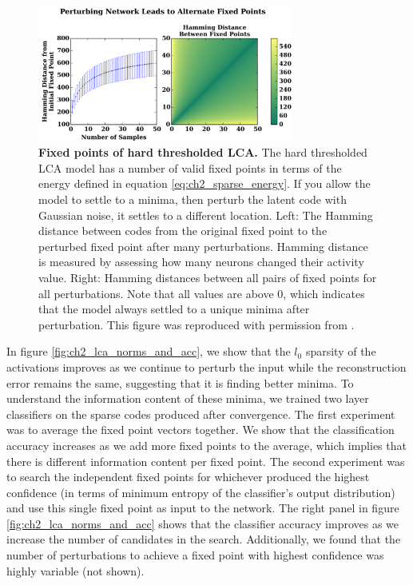 \begin{figure}[h]\label{fig:ch2_lca_fixed_point_distances}
    \centering
    \includegraphics[width=0.75\textwidth]{figures/lca_fixed_point_distances.png}
    \caption{\textbf{Fixed points of hard thresholded LCA.} The hard thresholded LCA model has a number of valid fixed points in terms of the energy defined in equation \ref{eq:ch2_sparse_energy}. If you allow the model to settle to a minima, then perturb the latent code with Gaussian noise, it settles to a different location. Left: The Hamming distance between codes from the original fixed point to the perturbed fixed point after many perturbations. Hamming distance is measured by assessing how many neurons changed their activity value. Right: Hamming distances between all pairs of fixed points for all perturbations. Note that all values are above 0, which indicates that the model always settled to a unique minima after perturbation. This figure was reproduced with permission from \parencite{shainin2016sampling}.}
\end{figure}

In figure \ref{fig:ch2_lca_norms_and_acc}, we show that the $l_{0}$ sparsity of the activations improves as we continue to perturb the input while the reconstruction error remains the same, suggesting that it is finding better minima. To understand the information content of these minima, we trained two layer classifiers on the sparse codes produced after convergence. The first experiment was to average the fixed point vectors together. We show that the classification accuracy increases as we add more fixed points to the average, which implies that there is different information content per fixed point. The second experiment was to search the independent fixed points for whichever produced the highest confidence (in terms of minimum entropy of the classifier's output distribution) and use this single fixed point as input to the network. The right panel in figure \ref{fig:ch2_lca_norms_and_acc} shows that the classifier accuracy improves as we increase the number of candidates in the search. Additionally, we found that the number of perturbations to achieve a fixed point with highest confidence was highly variable (not shown).

